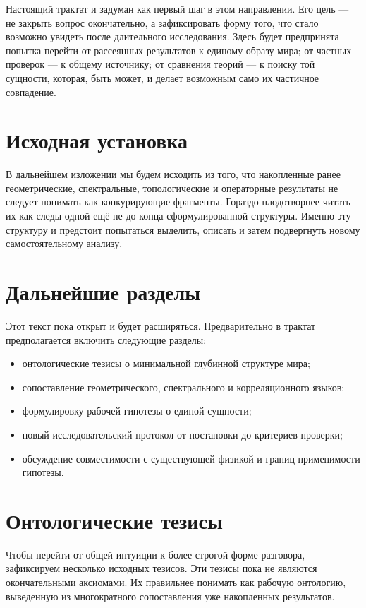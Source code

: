 \documentclass[12pt,a4paper]{article}
\begin{document}
Настоящий трактат и задуман как первый шаг в этом направлении. Его цель --- не закрыть вопрос окончательно, а зафиксировать форму того, что стало возможно увидеть после длительного исследования. Здесь будет предпринята попытка перейти от рассеянных результатов к единому образу мира; от частных проверок --- к общему источнику; от сравнения теорий --- к поиску той сущности, которая, быть может, и делает возможным само их частичное совпадение.

\section{Исходная установка}

В дальнейшем изложении мы будем исходить из того, что накопленные ранее геометрические, спектральные, топологические и операторные результаты не следует понимать как конкурирующие фрагменты. Гораздо плодотворнее читать их как следы одной ещё не до конца сформулированной структуры. Именно эту структуру и предстоит попытаться выделить, описать и затем подвергнуть новому самостоятельному анализу.

\section{Дальнейшие разделы}

Этот текст пока открыт и будет расширяться. Предварительно в трактат предполагается включить следующие разделы:
\begin{itemize}
    \item онтологические тезисы о минимальной глубинной структуре мира;
    \item сопоставление геометрического, спектрального и корреляционного языков;
    \item формулировку рабочей гипотезы о единой сущности;
    \item новый исследовательский протокол от постановки до критериев проверки;
    \item обсуждение совместимости с существующей физикой и границ применимости гипотезы.
\end{itemize}

\section{Онтологические тезисы}

Чтобы перейти от общей интуиции к более строгой форме разговора, зафиксируем несколько исходных тезисов. Эти тезисы пока не являются окончательными аксиомами. Их правильнее понимать как рабочую онтологию, выведенную из многократного сопоставления уже накопленных результатов.
\end{document}
